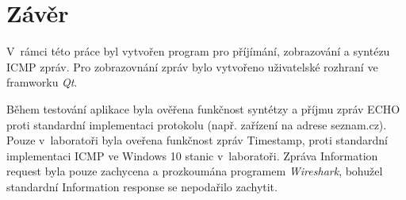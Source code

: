 \documentclass[12pt, a4paper]{article}
\begin{document}
\section{Závěr}

V~rámci této práce byl vytvořen program pro příjímání, zobrazování a syntézu ICMP zpráv. Pro zobrazovnání zpráv bylo vytvořeno uživatelské rozhraní ve framworku \emph{Qt}.

Během testování aplikace byla ověřena funkčnost syntétzy a příjmu zpráv ECHO proti standardní implementaci protokolu (např. zařízení na adrese seznam.cz). Pouze v~laboratoři byla oveřena funkčnost zpráv Timestamp, proti standardní implementaci ICMP ve Windows 10 stanic v~laboratoři. Zpráva Information request byla pouze zachycena a prozkoumána programem \emph{Wireshark}, bohužel standardní Information response se nepodařilo zachytit.
\end{document}
